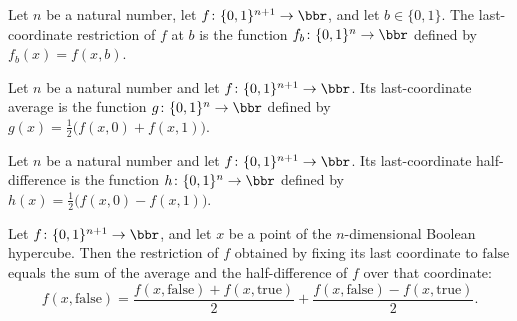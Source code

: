 \begin{definition}
\label{BooleanAnalysis.Hypercontractivity.restrictLast}
\leanok
{}
Let $n$ be a natural number, let $f\colon\{0,1\}^{n+1}\to\bbr$, and let
$b\in\{0,1\}$. The last-coordinate restriction of $f$ at $b$ is the function
$f_b\colon\{0,1\}^n\to\bbr$ defined by $f_b(x)=f(x,b)$.
\end{definition}

\begin{definition}
\label{BooleanAnalysis.Hypercontractivity.avgLast}
\leanok
{}
Let $n$ be a natural number and let $f\colon\{0,1\}^{n+1}\to\bbr$. Its
last-coordinate average is the function $g\colon\{0,1\}^n\to\bbr$ defined by
$g(x)=\tfrac12\bigl(f(x,0)+f(x,1)\bigr)$.
\end{definition}

\begin{definition}
\label{BooleanAnalysis.Hypercontractivity.diffLast}
\leanok
{}
Let $n$ be a natural number and let $f\colon\{0,1\}^{n+1}\to\bbr$. Its
last-coordinate half-difference is the function $h\colon\{0,1\}^n\to\bbr$ defined by
$h(x)=\tfrac12\bigl(f(x,0)-f(x,1)\bigr)$.
\end{definition}

\begin{lemma}
\label{BooleanAnalysis.Hypercontractivity.restrictLast_false_eq}
\leanok
{}
Let $f\colon\{0,1\}^{n+1}\to\bbr$, and let $x$ be a point of the
$n$-dimensional Boolean hypercube. Then the restriction of $f$ obtained by fixing its
last coordinate to $\mathrm{false}$ equals the sum of the average and the
half-difference of $f$ over that coordinate:
\[
f(x,\mathrm{false}) = \frac{f(x,\mathrm{false}) + f(x,\mathrm{true})}{2} +
\frac{f(x,\mathrm{false}) - f(x,\mathrm{true})}{2}.
\]
\end{lemma}

